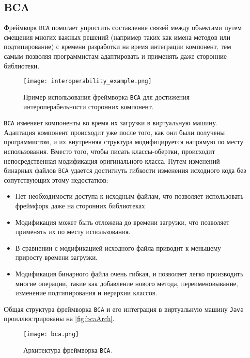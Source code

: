 \subsection{BCA}

Фреймворк \texttt{BCA} помогает упростить составление связей между объектами путем смещения многих важных решений (например таких как имена методов или подтипирование) с времени разработки на время интеграции компонент, тем самым позволяя программистам адаптировать и применять даже сторонние библиотеки. 

\begin{figure}[h]
\centering
\texttt{[image: interoperability\_example.png]}
\caption{Пример использования фреймворка \texttt{BCA} для достижения интероперабельности сторонних компонент.}
\label{fig:interopExample}
\end{figure}

\texttt{BCA} изменяет компоненты во время их загрузки в виртуальную машину. Адаптация компонент происходит уже после того, как они были получены программистом, и их внутренняя структура модифицируется напрямую по месту использования. Вместо того, чтобы писать классы-обертки, происходит непосредственная модификация оригинального класса. Путем изменений бинарных файлов \texttt{BCA} удается достигнуть гибкости изменения исходного кода без сопутствующих этому недостатков:

\begin{itemize}
    \item Нет необходимости доступа к исходным файлам, что позволяет использовать фреймфорк даже на сторонних библиотеках
    \item Модификация может быть отложена до времени загрузки, что позволяет применять их по месту использования.
    \item В сравнении с модификацией исходного файла приводит к меньшему приросту времени загрузки.
    \item Модификация бинарного файла очень гибкая, и позволяет легко производить многие операции, такие как добавление нового метода, переименовывание, изменение подтипирования и иерархии классов.
\end{itemize}

Общая структура фреймворка \texttt{BCA} и его интеграция в виртуальную машину \texttt{Java} проиллюстрированы на \autoref{fig:bcaArch}.

\begin{figure}[h]
\centering
\texttt{[image: bca.png]}
\caption{Архитектура фреймворка \texttt{BCA}.}
\label{fig:bcaArch}
\end{figure}

